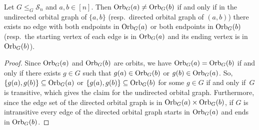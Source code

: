 \begin{lemma} \label{prelim:lem:orbitals-distinct-orbits}
	Let $G \le_G \mathcal S_n$ and $a,b \in [n]$.
	Then $\Orbit{a}{G} \ne \Orbit{b}{G}$
	if and only if in the undirected orbital graph of $\{a,b\}$ (resp.~directed orbital graph of $(a,b)$)
	there exists no edge with 
	both 
	endpoints in $\Orbit{a}{G}$
	or both endpoints in $\Orbit{b}{G}$
	(resp.~the starting vertex of each edge is in $\Orbit{a}{G}$ 
	and its ending vertex is in $\Orbit{b}{G}$).
\end{lemma}
\begin{proof}
	Since $\Orbit{a}{G}$ and $\Orbit{b}{G}$ are orbits, we have $\Orbit{a}{G} = \Orbit{b}{G}$
	if and only if there exists $g \in G$ such that $g(a) \in \Orbit{b}{G}$ or $g(b) \in \Orbit{a}{G}$.
	So,  $\{g(a), g(b)\} \subseteq \Orbit{a}{G}$
	or $\{g(a), g(b)\} \subseteq \Orbit{b}{G}$ for some $g \in G$
	if and only if~$G$ is transitive, which
	gives the claim for the undirected orbital graph.
	Furthermore, since the edge set of the directed orbital graph is in $\Orbit{a}{G} \times \Orbit{b}{G}$,
	if $G$ is intransitive every edge of the directed orbital graph
	starts in $\Orbit{a}{G}$ and ends in $\Orbit{b}{G}$.	
\end{proof}